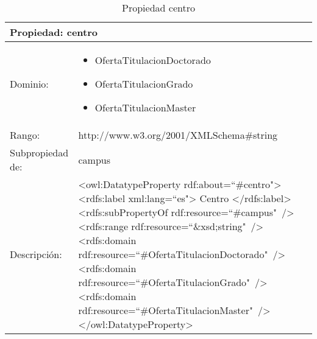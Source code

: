 \begin{table}[!ht]
	\centering
	\begin{tabular}{|p{}|p{}|}
		\hline
		\multicolumn{2}{|l|}{Propiedad: \textbf{centro}}
		\\ \hline
		Dominio:&
		\begin{itemize}
			\item OfertaTitulacionDoctorado
			\item OfertaTitulacionGrado
			\item OfertaTitulacionMaster
		\end{itemize}
		\\ \hline
		Rango:&
		http://www.w3.org/2001/XMLSchema\#string
		\\ \hline
		Subpropiedad de:&
		campus
		\\ \hline
		Descripción:&
		\textless owl:DatatypeProperty rdf:about=``\#centro"\textgreater\newline 
		\tab\textless rdfs:label xml:lang=``es"\textgreater\newline
		\tab\tab Centro\newline
		\tab\textless /rdfs:label\textgreater\newline
		\tab\textless rdfs:subPropertyOf\newline
		\tab\tab rdf:resource=``\#campus"\ /\textgreater\newline
		\tab\textless rdfs:range\newline
		\tab\tab rdf:resource=``\&xsd;string"\ /\textgreater\newline
		\tab\textless rdfs:domain\newline
		\tab\tab rdf:resource=``\#OfertaTitulacionDoctorado"\ /\textgreater\newline
		\tab\textless rdfs:domain\newline
		\tab\tab rdf:resource=``\#OfertaTitulacionGrado"\ /\textgreater\newline
		\tab\textless rdfs:domain\newline
		\tab\tab rdf:resource=``\#OfertaTitulacionMaster"\ /\textgreater\newline
		\textless /owl:DatatypeProperty\textgreater
		\\ \hline
	\end{tabular}
	\caption{Propiedad centro}
	\label{propiedad-centro}
\end{table}

